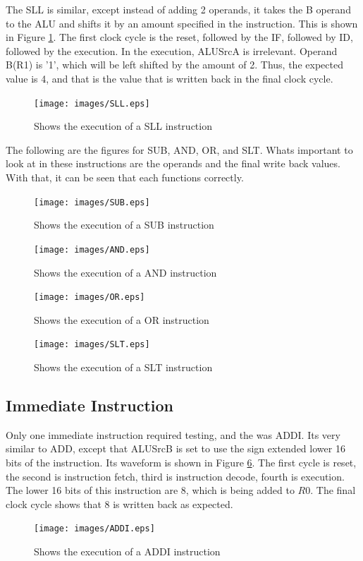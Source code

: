 \documentclass[12pt, a4paper]{article}
\begin{document}
The SLL is similar, except instead of adding 2 operands, it takes the B operand to the ALU
and shifts it by an amount specified in the instruction. This is shown in Figure \ref{fig:sll}.
The first clock cycle is the reset, followed by the IF, followed by ID, followed by the execution.
In the execution, ALUSrcA is irrelevant. Operand B(R1) is '1', which will be left shifted by the amount
of 2. Thus, the expected value is 4, and that is the value that is written back in the final clock cycle.

\begin{figure}[H]
  \centering
  \texttt{[image: images/SLL.eps]}
  \caption{Shows the execution of a SLL instruction}
  \label{fig:sll}
\end{figure}

The following are the figures for SUB, AND, OR, and SLT. Whats important to look at in these instructions
are the operands and the final write back values. With that, it can be seen that each functions correctly.

\begin{figure}[H]
  \centering
  \texttt{[image: images/SUB.eps]}
  \caption{Shows the execution of a SUB instruction}
  \label{fig:sub}
\end{figure}

\begin{figure}[H]
  \centering
  \texttt{[image: images/AND.eps]}
  \caption{Shows the execution of a AND instruction}
  \label{fig:and}
\end{figure}

\begin{figure}[H]
  \centering
  \texttt{[image: images/OR.eps]}
  \caption{Shows the execution of a OR instruction}
  \label{fig:or}
\end{figure}

\begin{figure}[H]
  \centering
  \texttt{[image: images/SLT.eps]}
  \caption{Shows the execution of a SLT instruction}
  \label{fig:slt}
\end{figure}

\subsection{Immediate Instruction}
Only one immediate instruction required testing, and the was ADDI. Its very similar to ADD, except
that ALUSrcB is set to use the sign extended lower 16 bits of the instruction. Its waveform is shown
in Figure \ref{fig:addi}. The first cycle is reset, the second is instruction fetch, third is instruction
decode, fourth is execution. The lower 16 bits of this instruction are 8, which is being added to
$R0$. The final clock cycle shows that 8 is written back as expected.
\begin{figure}[H]
  \centering
  \texttt{[image: images/ADDI.eps]}
  \caption{Shows the execution of a ADDI instruction}
  \label{fig:addi}
\end{figure}
\end{document}
